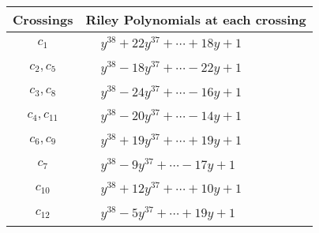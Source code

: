 \documentclass[1p]{elsarticle_modified}
\theoremstyle{definition}
\begin{document}
\begin{tabular}{m{50pt}|m{274pt}}
Crossings & \hspace{64pt}Riley Polynomials at each crossing \\
\hline $$\begin{aligned}c_{1}\end{aligned}$$&$\begin{aligned}
&y^{38}+22 y^{37}+\cdots+18 y+1
\end{aligned}$\\
\hline $$\begin{aligned}c_{2},c_{5}\end{aligned}$$&$\begin{aligned}
&y^{38}-18 y^{37}+\cdots-22 y+1
\end{aligned}$\\
\hline $$\begin{aligned}c_{3},c_{8}\end{aligned}$$&$\begin{aligned}
&y^{38}-24 y^{37}+\cdots-16 y+1
\end{aligned}$\\
\hline $$\begin{aligned}c_{4},c_{11}\end{aligned}$$&$\begin{aligned}
&y^{38}-20 y^{37}+\cdots-14 y+1
\end{aligned}$\\
\hline $$\begin{aligned}c_{6},c_{9}\end{aligned}$$&$\begin{aligned}
&y^{38}+19 y^{37}+\cdots+19 y+1
\end{aligned}$\\
\hline $$\begin{aligned}c_{7}\end{aligned}$$&$\begin{aligned}
&y^{38}-9 y^{37}+\cdots-17 y+1
\end{aligned}$\\
\hline $$\begin{aligned}c_{10}\end{aligned}$$&$\begin{aligned}
&y^{38}+12 y^{37}+\cdots+10 y+1
\end{aligned}$\\
\hline $$\begin{aligned}c_{12}\end{aligned}$$&$\begin{aligned}
&y^{38}-5 y^{37}+\cdots+19 y+1
\end{aligned}$\\
\hline
\end{tabular}\\~\\
\end{document}
